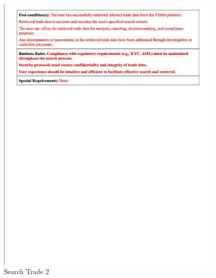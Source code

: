 \documentclass[a4paper]{report}
\begin{document}
\begin{figure}[h!]
    \centering
    \includegraphics[width=\textwidth]{images/uc/11.3-search-trade.png}
    \caption{Search Trade 2}
    \label{fig:11.2-search-trade}
\end{figure}
\end{document}
